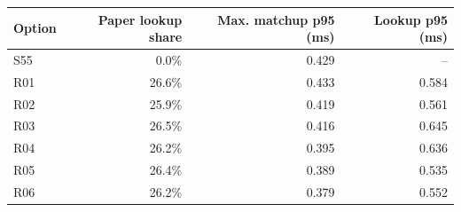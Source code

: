 \begin{tabular}{lrrr}
\toprule
Option & Paper lookup share & Max. matchup p95 (ms) & Lookup p95 (ms) \\
\midrule
S55 & 0.0\% & 0.429 & -- \\
R01 & 26.6\% & 0.433 & 0.584 \\
R02 & 25.9\% & 0.419 & 0.561 \\
R03 & 26.5\% & 0.416 & 0.645 \\
R04 & 26.2\% & 0.395 & 0.636 \\
R05 & 26.4\% & 0.389 & 0.535 \\
R06 & 26.2\% & 0.379 & 0.552 \\
\bottomrule
\end{tabular}
